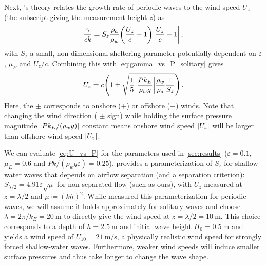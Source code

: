 \documentclass{jfm}
\renewcommand*{\epsilon}{\varepsilon}
\begin{document}
Next, \citeauthor{jeffreys1925formation}'s
\citeyearpar{jeffreys1925formation} theory relates the growth rate of
periodic waves to the wind speed $U_z$ (the subscript giving the
measurement height $z$) as
\begin{equation}
  \frac{\gamma}{c k} = S_z \frac{\rho_a}{\rho_w}
    \pqty{\frac{U_z}{c}-1} \abs{\frac{U_z}{c}-1} \,,
  \label{eq:gamma_vs_u_jeffreys}
\end{equation}
with $S_z$ a small, non-dimensional sheltering parameter potentially
dependent on $\epsilon$, $\mu_E$ and $U_z/c$.
Combining this with \cref{eq:gamma_vs_P_solitary} gives
\begin{equation}
  U_z = c \pqty{1 \pm \sqrt{\frac{1}{5} \abs{\frac{P k_E}{\rho_w g}}
    \frac{\rho_w}{\rho_a} \frac{1}{S_z}}} \,.
  \label{eq:U_vs_P}
\end{equation}
Here, the $\pm$ corresponds to onshore ($+$) or offshore ($-$) winds.
Note that changing the wind direction (\ie{} $\pm$ sign) while holding
the surface pressure magnitude $\abs{Pk_E/(\rho_w g)}$ constant means
onshore wind speed $\abs{U_z}$ will be larger than offshore wind speed
$\abs{U_z}$.

We can evaluate \cref{eq:U_vs_P} for the parameters used in
\cref{sec:results} ($\epsilon=0.1$, $\mu_E = 0.6$ and $Pk/(\rho_w g
\epsilon) = 0.25$).
 provides a parameterization of $S_z$ for
shallow-water waves that depends on airflow separation (and a separation
criterion): $S_{\lambda/2} = 4.91 \epsilon \sqrt{\mu}$ for non-separated
flow (such as ours), with $U_z$ measured at $z=\lambda/2$ and $\mu
\coloneqq (kh)^2$.
While \citet{donelan2006wave} measured this parameterization for
periodic waves, we will assume it holds approximately for solitary waves
and choose $ \lambda = 2 \pi/k_E =
\SI{20}{\meter}$ to directly give the wind speed at $z = \lambda/2 =
\SI{10}{\meter}$.
This choice corresponds to a depth of $h = \SI{2.5}{\meter}$ and initial
wave height $H_0 = \SI{0.5}{\meter}$ and yields a wind speed of $U_{10}
= \SI{21}{\meter\per\second}$, a physically realistic wind speed for
strongly forced shallow-water waves.
Furthermore, weaker wind speeds will induce smaller surface pressures
and thus take longer to change the wave shape.
\end{document}

